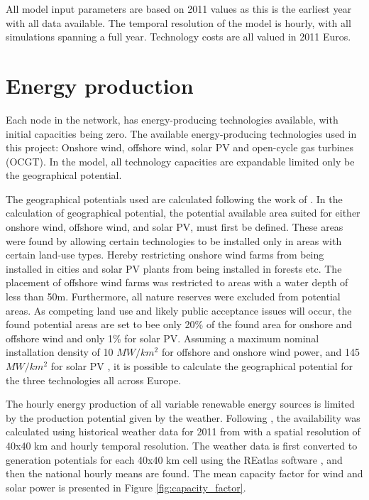 All model input parameters are based on 2011 values as this is the earliest year with all data available. The temporal resolution of the model is hourly, with all simulations spanning a full year. Technology costs are all valued in 2011 Euros. 

\section{Energy production}

Each node in the network, has energy-producing technologies available, with initial capacities being zero. The available energy-producing technologies used in this project: Onshore wind, offshore wind, solar PV and open-cycle gas turbines (OCGT). In the model, all technology capacities are expandable limited only be the geographical potential. 

The geographical potentials used are calculated following the work of  \cite{PyPSA_euro_30_model}. In the calculation of geographical potential, the potential available area suited for either onshore wind, offshore wind, and solar PV, must first be defined. These areas were found by allowing certain technologies to be installed only in areas with certain land-use types. Hereby restricting onshore wind farms from being installed in cities and solar PV plants from being installed in forests etc. The placement of offshore wind farms was restricted to areas with a water depth of less than 50m. Furthermore, all nature reserves were excluded from potential areas. As competing land use and likely public acceptance issues will occur, the found potential areas are set to bee only 20\% of the found area for onshore and offshore wind and only 1\% for solar PV. 
Assuming a maximum nominal installation density of 10 $MW/km^2$ for offshore and onshore wind power, and 145 $MW/km^2$ for solar PV \cite{PyPSA_euro_30_model}, it is possible to calculate the geographical potential for the three technologies all across Europe. 

The hourly energy production of all variable renewable energy sources is limited by the production potential given by the weather. Following \cite{PyPSA_euro_30_model}, the availability was calculated using historical weather data for 2011 from \cite{ClimateForecastSystem} with a spatial resolution of 40x40 km and hourly temporal resolution. The weather data is first converted to generation potentials for each 40x40 km cell using the REatlas software \cite{ANDRESEN20151074}, and then the national hourly means are found. The mean capacity factor for wind and solar power is presented in Figure \ref{fig:capacity_factor}.


